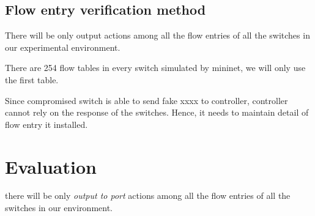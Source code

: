\subsection{Flow entry verification method}
There will be only output actions among all the flow entries of all the switches in our experimental environment.


There are 254 flow tables in every switch simulated by mininet, we will only use the first table.

Since compromised switch is able to send fake xxxx to controller, controller cannot rely on the response of the switches. Hence, it needs to maintain detail of flow entry it installed. 

\section{Evaluation}


there will be only \textit{output to port} actions among all the flow entries of all the switches in our environment. 